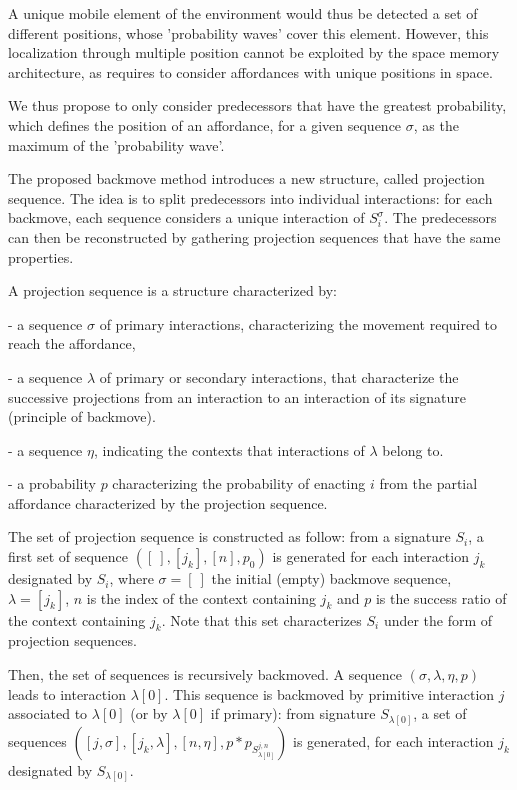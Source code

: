 \documentclass[conference]{IEEEtran}
\begin{document}
A unique mobile element of the environment would thus be detected a set of different positions, whose 'probability waves' cover this element. However, this localization through multiple position cannot be exploited by the space memory architecture, as requires to consider affordances with unique positions in space.

We thus propose to only consider predecessors that have the greatest probability, which defines the position of an affordance, for a given sequence $\sigma$, as the maximum of the 'probability wave'. 

The proposed backmove method introduces a new structure, called projection sequence. The idea is to split predecessors into individual interactions: for each backmove, each sequence considers a unique interaction of $S_i^{\sigma}$. The predecessors can then be reconstructed by gathering projection sequences that have the same properties. %

A projection sequence is a structure characterized by:

- a sequence $\sigma$ of primary interactions, characterizing the movement required to reach the affordance,

- a sequence $\lambda$ of primary or secondary interactions, that characterize the successive projections from an interaction to an interaction of its signature (principle of backmove).

- a sequence $\eta$, indicating the contexts that interactions of $\lambda$ belong to.

- a probability $p$ characterizing the probability of enacting $i$ from the partial affordance characterized by the projection sequence.


The set of projection sequence is constructed as follow: from a signature $S_i$, a first set of sequence $([\:], [j_k], [n], p_0)$ is generated for each interaction $j_k$ designated by $S_i$, where $\sigma=[\: ]$ the initial (empty) backmove sequence, $\lambda=[j_k]$, $n$ is the index of the context containing $j_k$ and $p$ is the success ratio of the context containing $j_k$. Note that this set characterizes $S_i$ under the form of projection sequences.

Then, the set of sequences is recursively backmoved. A sequence $(\sigma, \lambda, \eta, p)$ leads to interaction $\lambda[0]$. This sequence is backmoved by primitive interaction $j$ associated to $\lambda[0]$ (or by $\lambda[0]$ if primary): from signature $S_{\lambda[0]}$, a set of sequences $([j,\sigma], [j_k,\lambda], [n,\eta], p*p_{S_{\lambda[0]}^{j,n}})$ is generated, for each interaction $j_k$ designated by $S_{\lambda[0]}$.
\end{document}
